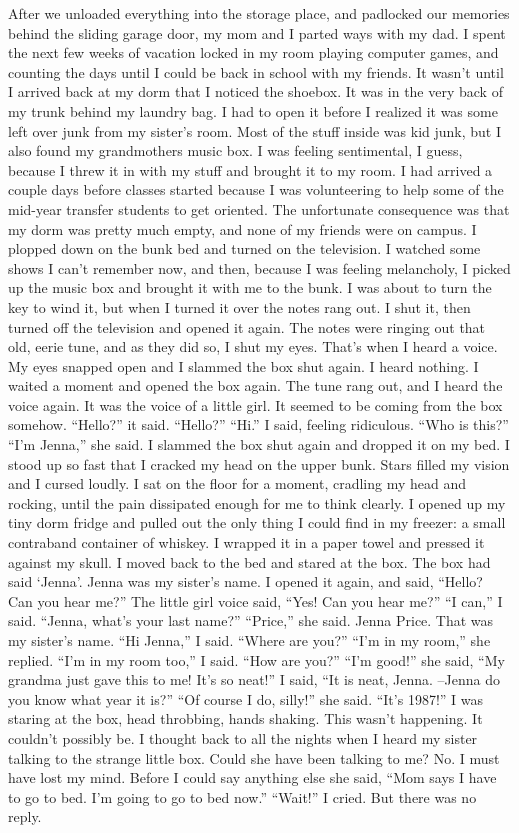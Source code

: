 \documentclass[a4paper]{article}
\begin{document}
After we unloaded everything into the storage place, and padlocked our memories behind the sliding garage door, my mom and I parted ways with my dad. I spent the next few weeks of vacation locked in my room playing computer games, and counting the days until I could be back in school with my friends.
It wasn’t until I arrived back at my dorm that I noticed the shoebox. It was in the very back of my trunk behind my laundry bag. I had to open it before I realized it was some left over junk from my sister’s room.
Most of the stuff inside was kid junk, but I also found my grandmothers music box. I was feeling sentimental, I guess, because I threw it in with my stuff and brought it to my room.
I had arrived a couple days before classes started because I was volunteering to help some of the mid-year transfer students to get oriented. The unfortunate consequence was that my dorm was pretty much empty, and none of my friends were on campus.
I plopped down on the bunk bed and turned on the television. I watched some shows I can’t remember now, and then, because I was feeling melancholy, I picked up the music box and brought it with me to the bunk.
I was about to turn the key to wind it, but when I turned it over the notes rang out. I shut it, then turned off the television and opened it again.
The notes were ringing out that old, eerie tune, and as they did so, I shut my eyes. That’s when I heard a voice.
My eyes snapped open and I slammed the box shut again. I heard nothing. I waited a moment and opened the box again. The tune rang out, and I heard the voice again. It was the voice of a little girl. It seemed to be coming from the box somehow.
“Hello?” it said. “Hello?”
“Hi.” I said, feeling ridiculous. “Who is this?”
“I’m Jenna,” she said. I slammed the box shut again and dropped it on my bed. I stood up so fast that I cracked my head on the upper bunk. Stars filled my vision and I cursed loudly.
I sat on the floor for a moment, cradling my head and rocking, until the pain dissipated enough for me to think clearly. I opened up my tiny dorm fridge and pulled out the only thing I could find in my freezer: a small contraband container of whiskey. I wrapped it in a paper towel and pressed it against my skull.
I moved back to the bed and stared at the box. The box had said ‘Jenna’. Jenna was my sister’s name.
I opened it again, and said, “Hello? Can you hear me?”
The little girl voice said, “Yes! Can you hear me?”
“I can,” I said. “Jenna, what’s your last name?”
“Price,” she said. Jenna Price. That was my sister’s name.
“Hi Jenna,” I said. “Where are you?”
“I’m in my room,” she replied.
“I’m in my room too,” I said. “How are you?”
“I’m good!” she said, “My grandma just gave this to me! It’s so neat!”
I said, “It is neat, Jenna. –Jenna do you know what year it is?”
“Of course I do, silly!” she said. “It’s 1987!”
I was staring at the box, head throbbing, hands shaking. This wasn’t happening. It couldn’t possibly be.
I thought back to all the nights when I heard my sister talking to the strange little box. Could she have been talking to me? No. I must have lost my mind.
Before I could say anything else she said, “Mom says I have to go to bed. I'm going to go to bed now.”
“Wait!” I cried. But there was no reply.
\end{document}
